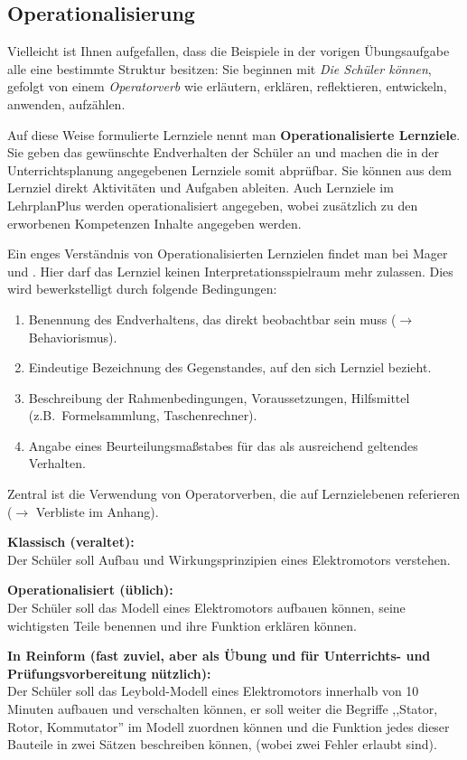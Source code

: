 \subsection{Operationalisierung}
Vielleicht ist Ihnen aufgefallen, dass die Beispiele in der vorigen Übungsaufgabe alle eine bestimmte Struktur besitzen: Sie beginnen mit \emph{Die Schüler können}, gefolgt von einem \emph{Operatorverb} wie erläutern, erklären, reflektieren, entwickeln, anwenden, aufzählen.

\mip
Auf diese Weise formulierte Lernziele nennt man \textbf{Operationalisierte Lernziele}. Sie geben das gewünschte Endverhalten der Schüler an und machen die in der Unterrichtsplanung angegebenen Lernziele somit abprüfbar. Sie können aus dem Lernziel direkt Aktivitäten und Aufgaben ableiten. Auch Lernziele im LehrplanPlus werden operationalisiert angegeben, wobei zusätzlich zu den erworbenen Kompetenzen Inhalte angegeben werden.

\mip
Ein enges Verständnis von Operationalisierten Lernzielen findet man bei Mager und \textcite{Gagne}. Hier darf das Lernziel keinen Interpretations\-spielraum mehr zulassen. Dies wird bewerkstelligt durch folgende Bedingungen:
\begin{enumerate}
	\item	Benennung des Endverhaltens, das direkt beobachtbar sein muss ($\to$ Behaviorismus).
	\item	Eindeutige Bezeichnung des Gegenstandes, auf den sich Lernziel bezieht.
	\item	Beschreibung der Rahmenbedingungen, Voraussetzungen, Hilfsmittel (z.B.\ Formelsammlung, Taschenrechner).
	\item	Angabe eines Beurteilungsma{\ss}stabes  f\"{u}r das als ausreichend 	geltendes Verhalten.
\end{enumerate} 
Zentral ist die Verwendung von Operatorverben, die auf Lernzielebenen referieren ($\to$ Verbliste im Anhang).

\begin{beisp}
	\textbf{Klassisch (veraltet):} \\ 
	Der Sch\"{u}ler soll Aufbau und Wirkungsprinzipien eines
	Elektromotors verstehen.
	
	\mip
	\textbf{Operationalisiert (üblich):} \\
	Der Sch\"{u}ler soll das Modell eines Elektromotors aufbauen k\"{o}nnen,
	seine wichtigsten Teile benennen und ihre Funktion erkl\"{a}ren k\"{o}nnen.
	
	\mip
	\textbf{In Reinform (fast zuviel, aber als Übung und für Unterrichts- und Prüfungsvorbereitung nützlich):} \\
	Der Sch\"{u}ler soll das Leybold-Modell eines Elektromotors
		innerhalb von 10 Minuten aufbauen und verschalten k\"{o}nnen, er
		soll weiter die Begriffe ,,Stator, Rotor, Kommutator'' im
		Modell zuordnen k\"{o}nnen und die Funktion jedes dieser Bauteile
		in zwei S\"{a}tzen beschreiben k\"{o}nnen, (wobei zwei Fehler erlaubt
		sind).
\end{beisp}

